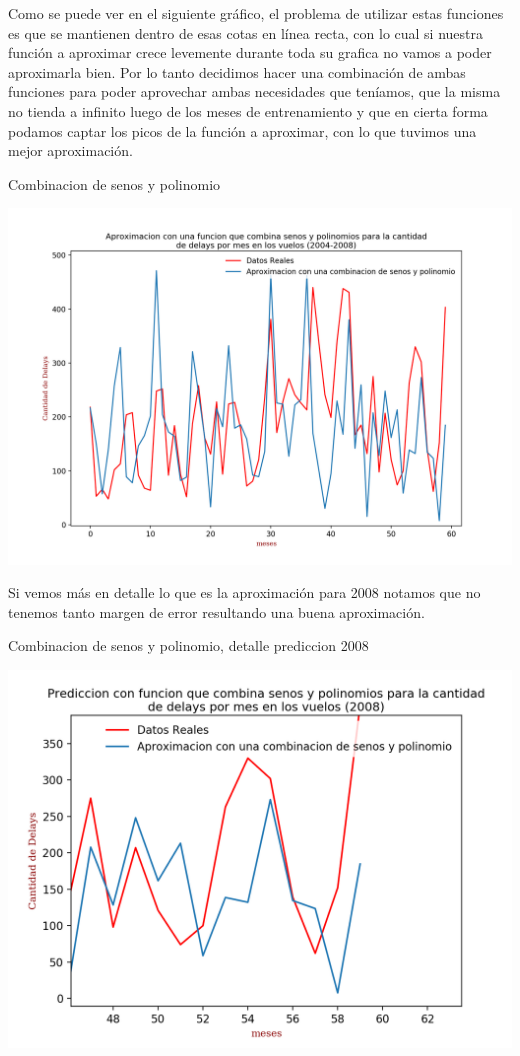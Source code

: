 \documentclass{endm}
\begin{document}
Como se puede ver en el siguiente gr\'afico, el problema de utilizar estas funciones es que se mantienen dentro de esas cotas en l\'inea recta, con lo cual si nuestra funci\'on a aproximar crece levemente durante toda su grafica no vamos a poder aproximarla bien.
Por lo tanto decidimos hacer una combinaci\'on de ambas funciones para poder aprovechar ambas necesidades que ten\'iamos, que la misma no tienda a infinito luego de los meses de entrenamiento y que en cierta forma podamos captar los picos de la funci\'on a aproximar, con lo que tuvimos una mejor aproximaci\'on.

	\begin{center}
	\caption{Combinacion de senos y polinomio}
	\includegraphics[scale=0.5]{imagenes/polinomioysenos.png}
	\end{center}

Si vemos m\'as en detalle lo que es la aproximaci\'on para 2008 notamos que no tenemos tanto margen de error resultando una buena aproximaci\'on.

	\begin{center}
	\caption{Combinacion de senos y polinomio, detalle prediccion 2008 }
	\includegraphics[scale=0.8]{imagenes/delays2008.png}
	\end{center}
\end{document}
